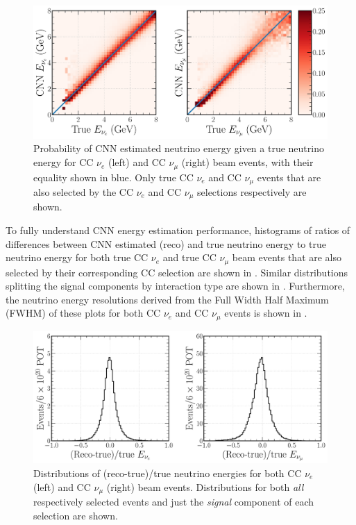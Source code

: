 \begin{figure} %
    \includegraphics[width=\textwidth]{diagrams/7-results/final_energy_2d.pdf}
    \caption[Probability of CNN estimated neutrino energy given a true neutrino energy]
    {Probability of CNN estimated neutrino energy given a true neutrino energy for CC $\nu_{e}$
        (left) and CC $\nu_{\mu}$ (right) beam events, with their equality shown in blue. Only
        true CC $\nu_{e}$ and CC $\nu_{\mu}$ events that are also selected by the CC $\nu_{e}$ and
        CC $\nu_{\mu}$ selections respectively are shown.}
    \label{fig:final_energy_2d}
\end{figure}

To fully understand CNN energy estimation performance, histograms of ratios of differences between
CNN estimated (reco) and true neutrino energy to true neutrino energy for both true CC $\nu_{e}$
and true CC $\nu_{\mu}$ beam events that are also selected by their corresponding CC selection are
shown in . Similar distributions splitting the signal components
by interaction type are shown in . Furthermore, the
neutrino energy resolutions derived from the Full Width Half Maximum (FWHM) of these plots for
both CC $\nu_{e}$ and CC $\nu_{\mu}$ events is shown in .

\begin{figure} %
    \includegraphics[width=\textwidth]{diagrams/7-results/final_energy_frac.pdf}
    \caption[Distributions of (reco-true)/true neutrino energies]
    {Distributions of (reco-true)/true neutrino energies for both CC $\nu_{e}$ (left) and CC
        $\nu_{\mu}$ (right) beam events. Distributions for both \emph{all} respectively selected
        events and just the \emph{signal} component of each selection are shown.}
    \label{fig:final_energy_frac}
\end{figure}


